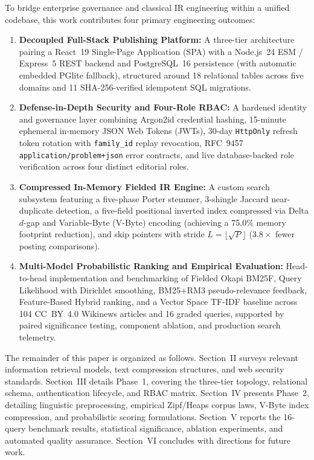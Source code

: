 \documentclass[conference]{IEEEtran}
\begin{document}
To bridge enterprise governance and classical IR engineering within a unified codebase, this work contributes four primary engineering outcomes:
\begin{enumerate}
\item \textbf{Decoupled Full-Stack Publishing Platform:} A three-tier architecture pairing a React~19 Single-Page Application (SPA) with a Node.js~24 ESM / Express~5 REST backend and PostgreSQL~16 persistence (with automatic embedded PGlite fallback), structured around 18 relational tables across five domains and 11 SHA-256-verified idempotent SQL migrations.
\item \textbf{Defense-in-Depth Security and Four-Role RBAC:} A hardened identity and governance layer combining Argon2id credential hashing, 15-minute ephemeral in-memory JSON Web Tokens (JWTs), 30-day \texttt{HttpOnly} refresh token rotation with \texttt{family\_id} replay revocation, RFC~9457 \texttt{application/problem+json} error contracts, and live database-backed role verification across four distinct editorial roles.
\item \textbf{Compressed In-Memory Fielded IR Engine:} A custom search subsystem featuring a five-phase Porter stemmer, 3-shingle Jaccard near-duplicate detection, a five-field positional inverted index compressed via Delta $d$-gap and Variable-Byte (V-Byte) encoding (achieving a 75.0\% memory footprint reduction), and skip pointers with stride $L = \lfloor\sqrt{P}\rfloor$ ($3.8\times$ fewer posting comparisons).
\item \textbf{Multi-Model Probabilistic Ranking and Empirical Evaluation:} Head-to-head implementation and benchmarking of Fielded Okapi BM25F, Query Likelihood with Dirichlet smoothing, BM25+RM3 pseudo-relevance feedback, Feature-Based Hybrid ranking, and a Vector Space TF-IDF baseline across 104 CC~BY~4.0 Wikinews articles and 16 graded queries, supported by paired significance testing, component ablation, and production search telemetry.
\end{enumerate}

The remainder of this paper is organized as follows. Section~II surveys relevant information retrieval models, text compression structures, and web security standards. Section~III details Phase~1, covering the three-tier topology, relational schema, authentication lifecycle, and RBAC matrix. Section~IV presents Phase~2, detailing linguistic preprocessing, empirical Zipf/Heaps corpus laws, V-Byte index compression, and probabilistic scoring formulations. Section~V reports the 16-query benchmark results, statistical significance, ablation experiments, and automated quality assurance. Section~VI concludes with directions for future work.
\end{document}
